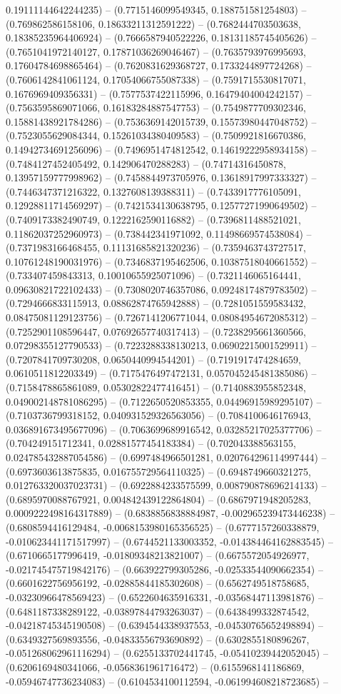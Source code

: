 0.19111144642244235) -- (0.7715146099549345, 0.188751581254803) -- (0.769862586158106, 0.18633211312591222) -- (0.7682444703503638, 0.18385235964406924) -- (0.7666587940522226, 0.18131185745405626) -- (0.7651041972140127, 0.17871036269046467) -- (0.7635793976995693, 0.17604784698865464) -- (0.7620831629368727, 0.1733244897724268) -- (0.7606142841061124, 0.17054066755087338) -- (0.7591715530817071, 0.1676969409356331) -- (0.7577537422115996, 0.16479404004242157) -- (0.7563595869071066, 0.16183284887547753) -- (0.7549877709302346, 0.15881438921784286) -- (0.7536369142015739, 0.15573980447048752) -- (0.7523055629084344, 0.15261034380409583) -- (0.7509921816670386, 0.14942734691256096) -- (0.7496951474812542, 0.14619222958934158) -- (0.7484127452405492, 0.142906470288283) -- (0.74714316450878, 0.13957159777998962) -- (0.7458844973705976, 0.13618917997333327) -- (0.7446347371216322, 0.1327608139388311) -- (0.7433917776105091, 0.12928811714569297) -- (0.7421534130638795, 0.12577271990649502) -- (0.7409173382490749, 0.1222162590116882) -- (0.7396811488521021, 0.11862037252960973) -- (0.738442341971092, 0.11498669574538084) -- (0.7371983166468455, 0.11131685821320236) -- (0.7359463743727517, 0.10761248190031976) -- (0.7346837195462506, 0.10387518040661552) -- (0.733407459843313, 0.10010655925071096) -- (0.7321146065164441, 0.09630821722102433) -- (0.7308020746357086, 0.09248174879783502) -- (0.7294666833115913, 0.08862874765942888) -- (0.7281051559583432, 0.08475081129123756) -- (0.7267141206771044, 0.08084954672085312) -- (0.7252901108596447, 0.07692657740317413) -- (0.7238295661360566, 0.07298355127790533) -- (0.7223288338130213, 0.06902215001529911) -- (0.7207841709730208, 0.0650440994544201) -- (0.7191917474284659, 0.0610511812203349) -- (0.7175476497472131, 0.057045245481385086) -- (0.7158478865861089, 0.05302822477416451) -- (0.7140883955852348, 0.049002148781086295) -- (0.7122650520853355, 0.04496915989295107) -- (0.7103736799318152, 0.040931529326563056) -- (0.7084100646176943, 0.036891673495677096) -- (0.7063699689916542, 0.03285217025377706) -- (0.704249151712341, 0.02881577454183384) -- (0.702043388563155, 0.024785432887054586) -- (0.6997484966501281, 0.020764296114997444) -- (0.6973603613875835, 0.016755729564110325) -- (0.6948749660321275, 0.012763320037023731) -- (0.6922884233575599, 0.008790878696214133) -- (0.6895970088767921, 0.004842439122864804) -- (0.6867971948205283, 0.0009222498164317889) -- (0.6838856838884987, -0.002965239473446238) -- (0.6808594416129484, -0.0068153980165356525) -- (0.6777157260338879, -0.010623441171517997) -- (0.6744521133003352, -0.014384464162883545) -- (0.6710665177996419, -0.01809348213821007) -- (0.6675572054926977, -0.021745475719842176) -- (0.663922799305286, -0.02533544090662354) -- (0.6601622756956192, -0.02885844185302608) -- (0.6562749518758685, -0.03230966478569423) -- (0.6522604635916331, -0.03568447113981876) -- (0.6481187338289122, -0.03897844793263037) -- (0.6438499332874542, -0.04218745345190508) -- (0.6394544338937553, -0.04530765652498894) -- (0.6349327569893556, -0.04833556793690892) -- (0.6302855180896267, -0.051268062961116294) -- (0.6255133702441745, -0.05410239442052045) -- (0.6206169480341066, -0.0568361961716472) -- (0.6155968141186869, -0.05946747736234083) -- (0.6104534100112594, -0.061994608218723685) -- 